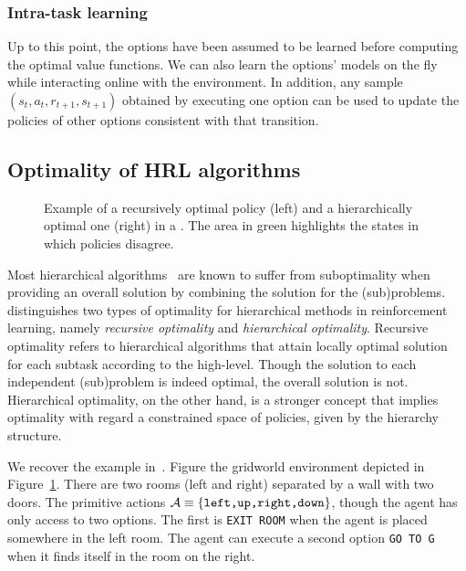 \subsubsection{Intra-task learning}
Up to this point, the options have been assumed to be learned before computing the optimal value functions. We can also learn the options' models on the fly while interacting online with the environment. In addition, any sample $(s_t, a_t, r_{t+1}, s_{t+1})$ obtained by executing one option can be used to update the policies of other options consistent with that transition.

\subsection{Optimality of HRL algorithms}
 
\begin{figure}
  \centering
  
  \hspace{25pt}
  
  \caption{Example of a recursively optimal policy (left) and a hierarchically optimal one (right) in a . The area in green highlights the states in which policies disagree.}
  \label{fig:hrl_optimality}
\end{figure}


Most hierarchical algorithms~\citep{Dietterich2000,Parr1997} are known to suffer from suboptimality when providing an overall solution by combining the solution for the (sub)problems. \citet{Dietterich2000} distinguishes two types of optimality for hierarchical methods in reinforcement learning, namely \textit{recursive optimality} and \textit{hierarchical optimality}. Recursive optimality refers to hierarchical algorithms that attain locally optimal solution for each subtask according to the high-level. Though the solution to each independent (sub)problem is indeed optimal, the overall solution is not. Hierarchical optimality, on the other hand, is a stronger concept that implies optimality with regard a constrained space of policies, given by the hierarchy structure.

\begin{example}[Example 2] We recover the example in~\citep{Dietterich2000}. Figure the gridworld environment depicted in Figure~\ref{fig:hrl_optimality}. There are two rooms (left and right) separated by a wall with two doors. The primitive actions $\mathcal{A}\equiv\{\text{\texttt{left,up,right,down}}\}$, though the agent has only access to two options. The first is \texttt{EXIT ROOM} when the agent is placed somewhere in the left room. The agent can execute a second option \texttt{GO TO G} when it finds itself in the room on the right.  
\end{example}



